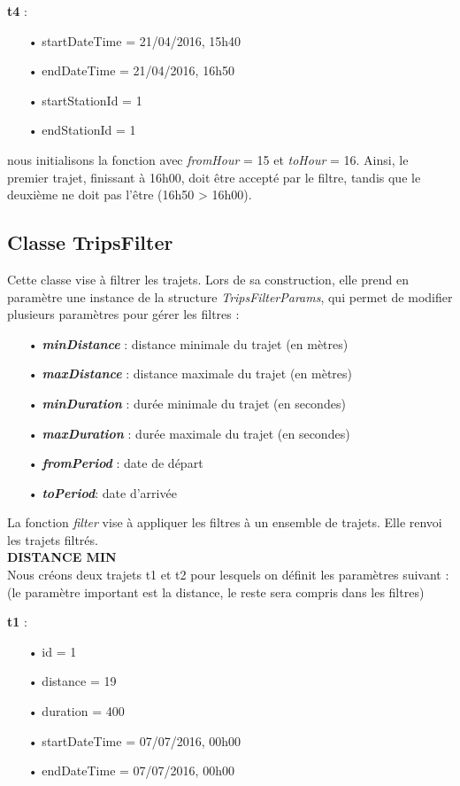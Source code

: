 \documentclass[12pt]{article}
\begin{document}
	
	\textbf{t4} :	
	\begin{itemize}
	\item[•] startDateTime = 21/04/2016, 15h40
	\item[•] endDateTime = 21/04/2016, 16h50
	\item[•] startStationId = 1
	\item[•] endStationId = 1 \\
	\end{itemize}
	
	nous initialisons la fonction avec \textit{fromHour} = 15 et \textit{toHour} = 16. Ainsi, le premier trajet, finissant à 16h00, doit être accepté par le filtre, tandis que le deuxième ne doit pas l’être (16h50 > 16h00).\\

	\subsection{Classe TripsFilter}
	Cette classe vise à filtrer les trajets. Lors de sa construction, elle prend en paramètre une instance de la structure \textit{TripsFilterParams}, qui permet de modifier plusieurs paramètres pour gérer les filtres :\\
	\begin{itemize}
	\item[•] \textbf{\textit{minDistance}} : distance minimale du trajet (en mètres)
	\item[•] \textbf{\textit{maxDistance}} : distance maximale du trajet (en mètres)
	\item[•] \textbf{\textit{minDuration}} : durée minimale du trajet (en secondes)
	\item[•] \textbf{\textit{maxDuration}} : durée maximale du trajet (en secondes)
	\item[•] \textbf{\textit{fromPeriod}} : date de départ
	\item[•] \textbf{\textit{toPeriod}}: date d’arrivée	
	\end{itemize}
		
	La fonction \textit{filter} vise à appliquer les filtres à un ensemble de trajets. Elle renvoi les trajets filtrés.\\

	\textbf{DISTANCE MIN}\\
	Nous créons deux trajets t1 et t2 pour lesquels on définit les paramètres suivant : (le paramètre important est la distance, le reste sera compris dans les filtres)

	\textbf{t1} :\\
	\begin{itemize}
	\item[•] id = 1
	\item[•] distance = 19
	\item[•] duration = 400
	\item[•] startDateTime = 07/07/2016, 00h00
	\item[•] endDateTime = 07/07/2016, 00h00
	\end{itemize}
	
\end{document}
